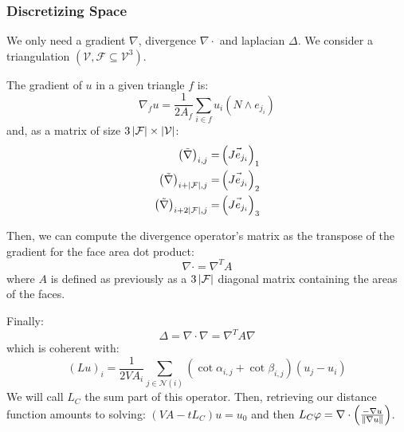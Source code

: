 \documentclass{beamercours}
\def\mF{\mathcal{F}}
\def\mV{\mathcal{V}}
\begin{document}
\begin{frame}[allowframebreaks]
	\frametitle{Discretizing Space}
	We only need a gradient $\nabla$, divergence $\nabla \cdot$ and laplacian $\Delta$.
	We consider a triangulation $\left(\mV, \mF \subseteq \mV^{3}\right)$.
	\framebreak

	The gradient of $u$ in a given triangle $f$ is:
	\begin{equation}
		\nabla_{f} u = \frac{1}{2A_{f}}\sum_{i \in f} u_{i}\left( N \land e_{j_{i}} \right)
	\end{equation}
	and, as a matrix of size $3\abs{\mF} \times \abs{\mV}$:
	\begin{equation}
		\begin{aligned}
			\left(\tilde{\nabla}\right)_{i, j} =& \left( \vec{Je_{j_{i}}} \right)_{1}\\
			\left(\tilde{\nabla}\right)_{i + \abs{\mF}, j} =& \left( \vec{Je_{j_{i}}} \right)_{2}\\
			\left(\tilde{\nabla}\right)_{i + 2\abs{\mF}, j} =& \left( \vec{Je_{j_{i}}} \right)_{3}
		\end{aligned}
	\end{equation}

	Then, we can compute the divergence operator's matrix as the transpose of the gradient for the face area dot product:
	\begin{equation}
		\nabla\cdot = \nabla^{T}A
	\end{equation}
	where $A$ is defined as previously as a $3\abs{\mF}$ diagonal matrix containing the areas of the faces.
	\framebreak

	Finally:
	\begin{equation}
		\Delta = \nabla \cdot \nabla = \nabla^{T}A\nabla
	\end{equation}
	which is coherent with:
	\begin{equation}
		\left( Lu \right)_{i} = \frac{1}{2VA_{i}}\sum_{j \in \mathcal{N}\left( i \right)}\left( \cot\alpha_{i, j} + \cot\beta_{i, j} \right)\left( u_{j} - u_{i} \right)
	\end{equation}
	We will call $L_{C}$ the sum part of this operator.
	Then, retrieving our distance function amounts to solving: $\left(VA - tL_{C}\right)u = u_{0}$ and then $L_{C}\varphi = \nabla\cdot \left( \frac{-\nabla u}{\left\lVert \nabla u \right\rVert} \right)$.
\end{frame}
\end{document}
